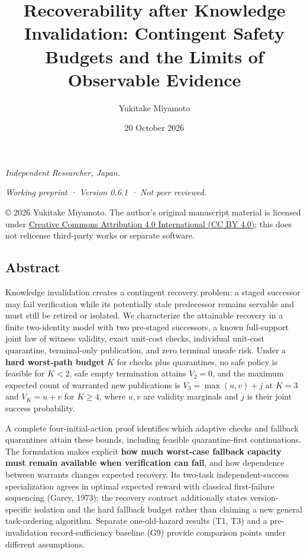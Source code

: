 \documentclass[
  10pt,
  american,
  a4paper,
]{article}
\title{Recoverability after Knowledge Invalidation: Contingent Safety
Budgets and the Limits of Observable Evidence}
\author{Yukitake Miyamoto}
\date{20 October 2026}
\begin{document}
\maketitle

\emph{Independent Researcher, Japan.}

\emph{Working preprint · Version 0.6.1 · Not peer reviewed.}

© 2026 Yukitake Miyamoto. The author's original manuscript material is
licensed under
\href{https://creativecommons.org/licenses/by/4.0/}{Creative Commons
Attribution 4.0 International (CC BY 4.0)}; this does not relicense
third-party works or separate software.

\hypertarget{abstract}{%
\subsection{Abstract}\label{abstract}}

Knowledge invalidation creates a contingent recovery problem: a staged
successor may fail verification while its potentially stale predecessor
remains servable and must still be retired or isolated. We characterize
the attainable recovery in a finite two-identity model with two
pre-staged successors, a known full-support joint law of witness
validity, exact unit-cost checks, individual unit-cost quarantine,
terminal-only publication, and zero terminal unsafe risk. Under a
\textbf{hard worst-path budget} \(K\) for checks plus quarantines, no
safe policy is feasible for \(K<2\), safe empty termination attains
\(V_2=0\), and the maximum expected count of warranted new publications
is \(V_3=\max(u,v)+j\) at \(K=3\) and \(V_K=u+v\) for \(K\ge4\), where
\(u,v\) are validity marginals and \(j\) is their joint success
probability.

A complete four-initial-action proof identifies which adaptive checks
and fallback quarantines attain these bounds, including feasible
quarantine-first continuations. The formulation makes explicit
\textbf{how much worst-case fallback capacity must remain available when
verification can fail}, and how dependence between warrants changes
expected recovery. Its two-task independent-success specialization
agrees in optimal expected reward with classical first-failure
sequencing (Garey, 1973); the recovery contract additionally states
version-specific isolation and the hard fallback budget rather than
claiming a new general task-ordering algorithm. Separate one-old-hazard
results (T1, T3) and a pre-invalidation record-sufficiency baseline (G9)
provide comparison points under different assumptions.
\end{document}
